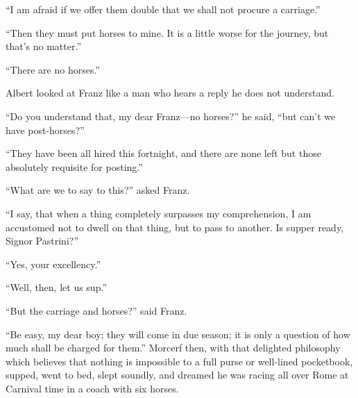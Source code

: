 “I am afraid if we offer them double that we shall not procure a
carriage.”

“Then they must put horses to mine. It is a little worse for the
journey, but that’s no matter.”

“There are no horses.”

Albert looked at Franz like a man who hears a reply he does not
understand.

“Do you understand that, my dear Franz—no horses?” he said, “but can’t
we have post-horses?”

“They have been all hired this fortnight, and there are none left but
those absolutely requisite for posting.”

“What are we to say to this?” asked Franz.

“I say, that when a thing completely surpasses my comprehension, I am
accustomed not to dwell on that thing, but to pass to another. Is
supper ready, Signor Pastrini?”

“Yes, your excellency.”

“Well, then, let us sup.”

“But the carriage and horses?” said Franz.

“Be easy, my dear boy; they will come in due season; it is only a
question of how much shall be charged for them.” Morcerf then, with
that delighted philosophy which believes that nothing is impossible to
a full purse or well-lined pocketbook, supped, went to bed, slept
soundly, and dreamed he was racing all over Rome at Carnival time in a
coach with six horses.
